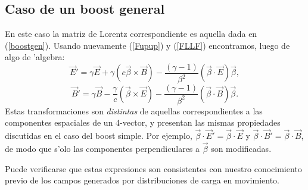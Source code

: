 \subsection{Caso de un boost general}
En este caso la matriz de Lorentz correspondiente es aquella dada en
(\ref{boostgen}). Usando nuevamente (\ref{Fupup}) y (\ref{FLLF}) encontramos, luego de algo de 'algebra:
\begin{equation}
\boxed{\vec{E}'=\gamma \vec{E}+\gamma \left(c\vec{\beta}\times
\vec{B}\right) -\frac{(\gamma -1)}{\beta^2}\left( \vec{\beta}\cdot
\vec{E}\right) \vec{\beta} ,} \label{TLE}
\end{equation}
\begin{equation}
\boxed{\vec{B}'=\gamma \vec{B}-\frac{\gamma}{c} \left(\vec{\beta}\times
\vec{E}\right) -\frac{(\gamma -1)}{\beta^2}\left( \vec{\beta}\cdot
\vec{B}\right) \vec{\beta}.} \label{TLB}
\end{equation}
Estas transformaciones son \textit{distintas} de aquellas correspondientes a las componentes espaciales de un 4-vector, y presentan las mismas propiedades
discutidas en el caso del boost simple. Por ejemplo,
$\vec{\beta}\cdot\vec{E}'=\vec{\beta}\cdot\vec{E}$ y
$\vec{\beta}\cdot\vec{B}'=\vec{\beta}\cdot\vec{B}$, de modo que s'olo las
componentes perpendiculares a $\vec{\beta}$ son modificadas.

Puede verificarse que estas expresiones son consistentes con nuestro conocimiento previo de los campos generados por distribuciones de carga en movimiento.

